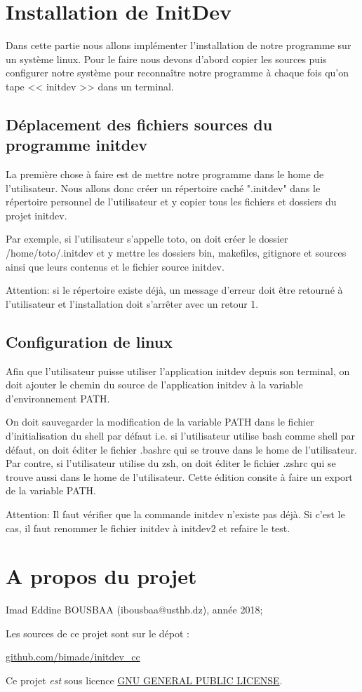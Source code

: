 \documentclass[10pt,a4paper]{article}
\begin{document}
\section{Installation de InitDev}
\label{sec:insl}
Dans cette partie nous allons implémenter l'installation de notre programme sur un système linux. Pour le faire nous devons d'abord copier les sources puis configurer notre système pour reconnaître notre programme à chaque fois qu'on tape << initdev >> dans un terminal.

\subsection{Déplacement des fichiers sources du programme initdev}   
La première chose à faire est de mettre notre programme dans le home de l'utilisateur. Nous allons donc créer un répertoire caché ".initdev" dans le répertoire personnel de l'utilisateur et y copier tous les fichiers et dossiers du projet initdev. 

Par exemple, si l'utilisateur s'appelle toto, on doit créer le dossier /home/toto/.initdev et y mettre les dossiers bin, makefiles, gitignore et sources ainsi que leurs contenus et le fichier source initdev. 

Attention: si le répertoire existe déjà, un message d'erreur doit être retourné à l'utilisateur et l'installation doit s'arrêter avec un retour 1.

\subsection{Configuration de linux}

Afin que l'utilisateur puisse utiliser l'application initdev depuis son terminal, on doit ajouter le chemin du source de l'application initdev à la variable d'environnement PATH. 

On doit sauvegarder la modification de la variable PATH dans le fichier d'initialisation du shell par défaut i.e. si l'utilisateur utilise bash comme shell par défaut, on doit éditer le fichier .bashrc qui se trouve dans le home de l'utilisateur. Par contre, si l'utilisateur utilise du zsh, on doit éditer le fichier .zshrc qui se trouve aussi dans le home de l'utilisateur. Cette édition consite à faire un export de la variable PATH.

Attention: Il faut vérifier que la commande initdev n'existe pas déjà. Si c'est le cas, il faut renommer le fichier initdev à initdev2 et refaire le test.

\section*{A propos du projet}
Imad Eddine BOUSBAA (ibousbaa@usthb.dz), année 2018;

Les sources de ce projet sont sur le dépot :

  \begin{center}\url{github.com/bimade/initdev_cc}\end{center}

  Ce projet \emph{est} sous licence \href{https://www.gnu.org/licenses/gpl-3.0.html}{GNU GENERAL PUBLIC LICENSE}.
\end{document}

